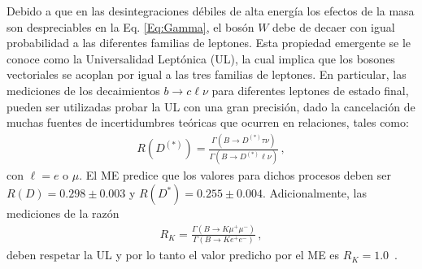 %
Debido a que en las desintegraciones débiles de alta energía los efectos de la masa son despreciables en la Eq. \eqref{Eq:Gamma}, el bosón $W$ debe de decaer con igual probabilidad a las diferentes familias de leptones. Esta propiedad emergente se le conoce como la Universalidad Leptónica (UL), la cual implica que los bosones vectoriales se acoplan por igual a las tres familias de leptones. 
En particular, las mediciones de los decaimientos $b \rightarrow c \ell \nu$ para diferentes leptones de estado final, pueden ser utilizadas probar la UL con una gran precisión, dado la cancelación de muchas fuentes de incertidumbres teóricas que ocurren en relaciones, tales como:
\begin{align}
R(D^{(*)}) = \frac{\Gamma(B \rightarrow D^{(*)} \tau \nu)}{\Gamma(B \rightarrow D^{(*)} \ell \nu)}\,,
\end{align}
con $\ell = e$ o $\mu$. El ME predice que los valores para dichos procesos deben ser $R(D) = 0.298 \pm 0.003$ y $R(D^*) = 0.255 \pm 0.004 $. Adicionalmente, las mediciones de la razón
\begin{align}
R_K = \frac{\Gamma(B \rightarrow K \mu ^+ \mu ^-)}{\Gamma(B \rightarrow K e^+ e^-)}\,,
\end{align}
deben respetar la UL y por lo tanto el valor predicho por el ME es $R_K = 1.0$~\cite{Beringer:1900zz}.
